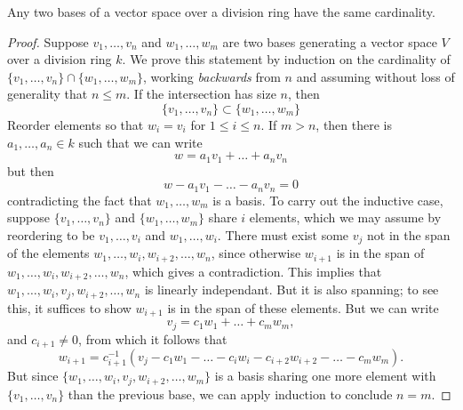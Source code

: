 \begin{theorem}
    Any two bases of a vector space over a division ring have the same cardinality.
\end{theorem}
\begin{proof}
    Suppose $v_1, \dots, v_n$ and $w_1, \dots, w_m$ are two bases generating a vector space $V$ over a division ring $k$. We prove this statement by induction on the cardinality of $\{ v_1, \dots, v_n \} \cap \{ w_1, \dots, w_m \}$, working \emph{backwards} from $n$ and assuming without loss of generality that $n \leq m$. If the intersection has size $n$, then
    \[ \{ v_1, \dots, v_n \} \subset \{ w_1, \dots, w_m \} \]
    Reorder elements so that $w_i = v_i$ for $1 \leq i \leq n$. If $m > n$, then there is $a_1,\dots,a_n \in k$ such that we can write
    \[ w = a_1v_1 + \dots + a_nv_n \]
    but then
    \[ w - a_1v_1 - \dots - a_nv_n = 0 \]
    contradicting the fact that $w_1,\dots, w_m$ is a basis. To carry out the inductive case, suppose $\{ v_1, \dots, v_n \}$ and $\{ w_1, \dots, w_m \}$ share $i$ elements, which we may assume by reordering to be $v_1, \dots, v_i$ and $w_1, \dots, w_i$. There must exist some $v_j$ not in the span of the elements $w_1, \dots, w_i, w_{i+2}, \dots, w_n$, since otherwise $w_{i+1}$ is in the span of $w_1, \dots, w_i, w_{i+2}, \dots, w_n$, which gives a contradiction. This implies that $w_1, \dots, w_i, v_j, w_{i+2}, \dots, w_n$ is linearly independant. But it is also spanning; to see this, it suffices to show $w_{i+1}$ is in the span of these elements. But we can write
    \[ v_j = c_1w_1 + \dots + c_m w_m, \]
    and $c_{i+1} \neq 0$, from which it follows that
    \[ w_{i+1} = c_{i+1}^{-1} (v_j - c_1w_1 - \dots - c_iw_i - c_{i+2}w_{i+2} - \dots - c_mw_m). \]
    But since $\{ w_1, \dots, w_i, v_j, w_{i+2}, \dots, w_m \}$ is a basis sharing one more element with $\{ v_1, \dots, v_n \}$ than the previous base, we can apply induction to conclude $n = m$.
\end{proof}


